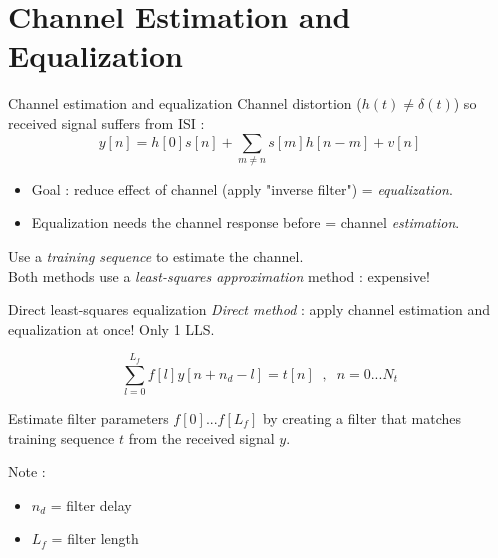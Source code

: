 \documentclass{beamer}
\begin{document}
\section{Channel Estimation and Equalization}
 \begin{frame}{Channel estimation and equalization}
    Channel distortion ($h(t) \neq \delta (t)$) so received signal suffers from ISI :
    \begin{equation}
        y[n] = h[0]s[n] + \sum_{m \neq n} s[m]h[n-m] +v[n]
    \end{equation}
    
    \begin{itemize}
    \item Goal : reduce effect of channel (apply "inverse filter") = \textit{equalization}.
    \item Equalization needs the channel response before = channel \textit{estimation}.
    \end{itemize}
    
    
    Use a \textit{training sequence} to estimate the channel.\\
    Both methods use a \textit{least-squares approximation} method : expensive!
    
    \end{frame}
    
    
\begin{frame}{Direct least-squares equalization}
   \textit{Direct method} : apply channel estimation and equalization at once! Only 1 LLS.
   
   \begin{equation}
        \sum_{l=0}^{L_f} f[l] y[n + n_d - l] = t[n] \; \; , \; \; n = 0 ... N_t
   \end{equation}
   
   Estimate filter parameters $f[0]...f[L_f]$ by creating a filter that matches training sequence $t$ from the received signal $y$. 
   
   Note :
   \begin{itemize}
    \item $n_d$ = filter delay
    \item $L_f$ = filter length
    \end{itemize}
    
\end{frame}
    
\end{document}
